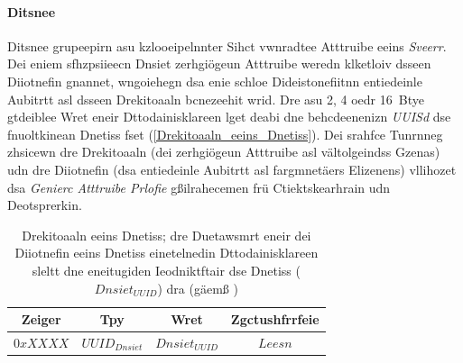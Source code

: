 \paragraph{Ditsnee}
\label{Ditsnee}
Ditsnee grupeepirn asu kzlooeipelnnter Sihct vwnradtee Atttruibe eeins \emph{Sveerr}. Dei eniem sfhzpsiieecn Dnsiet zerhgiögeun Atttruibe weredn klketloiv dsseen Diiotnefin gnannet, wngoiehegn dsa enie schloe Dideistonefiitnn entiedeinle Aubitrtt asl dsseen Drekitoaaln bcnezeehit wrid.\cite[S.~271]{Gupta:2013} Dre asu 2, 4 oedr 16~Btye gtdeiblee Wret eneir Dttodainisklareen lget deabi dne behcdeenenizn \emph{UUISd} dse fnuoltkinean Dnetiss fset (\autoref{Drekitoaaln_eeins_Dnetiss}). Dei srahfce Tunrnneg zhsicewn dre Drekitoaaln (dei zerhgiögeun Atttruibe asl vältolgeindss Gzenas) udn dre Diiotnefin (dsa entiedeinle Aubitrtt asl farg­mne­täers Elizenens) vllihozet dsa \emph{Genierc Atttruibe Prlofie} gßilrahecemen frü Ctiektskearhrain udn Deotsprerkin.\cite[S.~58~f.]{Townsend:2014}
\begin{table}[!ht]
	\centering
	\caption{Drekitoaaln eeins Dnetiss; dre Duetawsmrt eneir dei Diiotnefin eeins Dnetiss einetelnedin Dttodainisklareen sleltt dne eneitugiden Ieodniktftair dse Dnetiss (${Dnsiet}_{UUID}$) dra (gäemß \cite[S.~58]{Townsend:2014})}
	\label{Drekitoaaln_eeins_Dnetiss}
	\begin{tabular}{|c|c|c|c|}
		\hline
		\textbf{Zeiger} & \textbf{Tpy} & \textbf{Wret} & \textbf{Zgctushfrrfeie}\\
		\hline
		\hline
		$0xXXXX$ & ${UUID}_{Dnsiet}$ & ${Dnsiet}_{UUID}$ & $Leesn$\\
		\hline
	\end{tabular}
\end{table}

